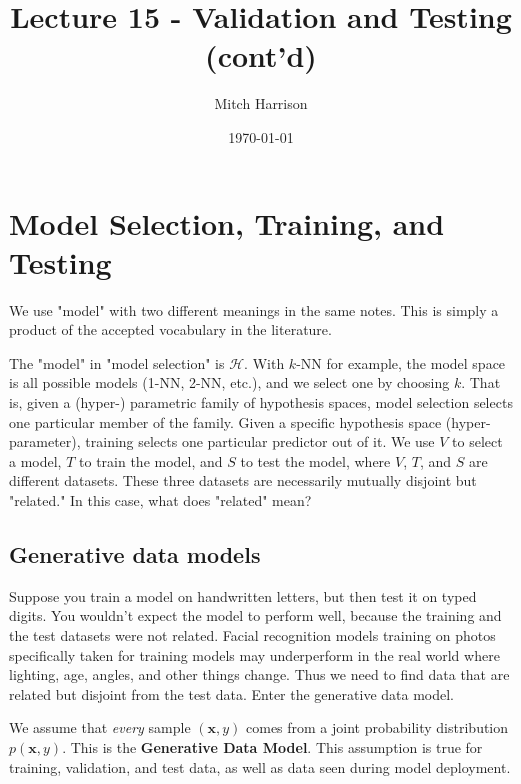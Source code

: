 \documentclass[titlepage, 12pt, leqno]{article}
\title{\Huge{Lecture 15 - Validation and Testing (cont'd)}}
\author{\large{Mitch Harrison}}
\date{\today}
\begin{document}
\setlength{\parskip}{1\baselineskip}
\setlength{\parindent}{15pt}
\maketitle
\tableofcontents
\newpage


\section{Model Selection, Training, and Testing}

\begin{note}
    We use "model" with two different meanings in the same notes. This is 
    simply a product of the accepted vocabulary in the literature.
\end{note}

The "model" in "model selection" is $\mathcal{H}$. With $k$-NN for example,
the model space is all possible models (1-NN, 2-NN, etc.), and we select one
by choosing $k$. That is, given a (hyper-) parametric family of hypothesis
spaces, model selection selects one particular member of the family. Given a
specific hypothesis space (hyper-parameter), training selects one particular
predictor out of it. We use $V$ to select a model, $T$ to train the model, and
$S$ to test the model, where $V$, $T$, and $S$ are different datasets. These
three datasets are necessarily mutually disjoint but "related." In this case,
what does "related" mean?

\subsection{Generative data models}
Suppose you train a model on handwritten letters, but then test it on typed
digits. You wouldn't expect the model to perform well, because the training and
the test datasets were not related. Facial recognition models training on 
photos specifically taken for training models may underperform in the real world
where lighting, age, angles, and other things change. Thus we need to find data
that are related but disjoint from the test data. Enter the generative data 
model.

\begin{definition}
    We assume that \textit{every} sample $(\textbf{x}, y)$ comes from a joint
    probability distribution $p(\textbf{x}, y)$. This is the \textbf{Generative
    Data Model}. This assumption is true for training, validation, and test
    data, as well as data seen during model deployment.
\end{definition}
\end{document}
